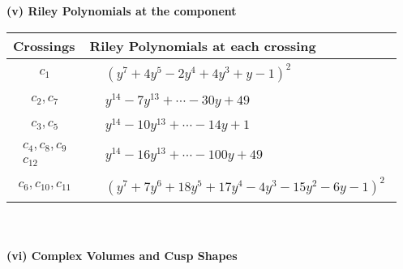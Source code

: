 \documentclass[1p]{elsarticle_modified}
\theoremstyle{definition}
\begin{document}
\newpage\renewcommand{\arraystretch}{1}
\flushleft \textbf{(v) Riley Polynomials at the component}\newline \\
\begin{tabular}{m{50pt}|m{274pt}}
Crossings & \hspace{64pt}Riley Polynomials at each crossing \\
\hline $$\begin{aligned}c_{1}\end{aligned}$$&$\begin{aligned}
&(y^7+4 y^5-2 y^4+4 y^3+y-1)^2
\end{aligned}$\\
\hline $$\begin{aligned}c_{2},c_{7}\end{aligned}$$&$\begin{aligned}
&y^{14}-7 y^{13}+\cdots-30 y+49
\end{aligned}$\\
\hline $$\begin{aligned}c_{3},c_{5}\end{aligned}$$&$\begin{aligned}
&y^{14}-10 y^{13}+\cdots-14 y+1
\end{aligned}$\\
\hline $$\begin{aligned}c_{4},c_{8},c_{9}\\c_{12}\end{aligned}$$&$\begin{aligned}
&y^{14}-16 y^{13}+\cdots-100 y+49
\end{aligned}$\\
\hline $$\begin{aligned}c_{6},c_{10},c_{11}\end{aligned}$$&$\begin{aligned}
&(y^7+7 y^6+18 y^5+17 y^4-4 y^3-15 y^2-6 y-1)^2
\end{aligned}$\\
\hline
\end{tabular}\\~\\
\newpage\flushleft \textbf{(vi) Complex Volumes and Cusp Shapes}
\end{document}
